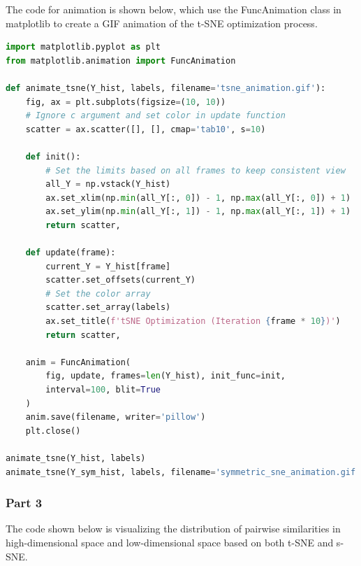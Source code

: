 \documentclass{homework}
\begin{document}
The code for animation is shown below, which use the FuncAnimation class in matplotlib to create a GIF animation of the t-SNE optimization process.

\begin{lstlisting}[language=Python]
import matplotlib.pyplot as plt
from matplotlib.animation import FuncAnimation

def animate_tsne(Y_hist, labels, filename='tsne_animation.gif'):
    fig, ax = plt.subplots(figsize=(10, 10))
    # Ignore c argument and set color in update function
    scatter = ax.scatter([], [], cmap='tab10', s=10)

    def init():
        # Set the limits based on all frames to keep consistent view
        all_Y = np.vstack(Y_hist)
        ax.set_xlim(np.min(all_Y[:, 0]) - 1, np.max(all_Y[:, 0]) + 1)
        ax.set_ylim(np.min(all_Y[:, 1]) - 1, np.max(all_Y[:, 1]) + 1)
        return scatter,

    def update(frame):
        current_Y = Y_hist[frame]
        scatter.set_offsets(current_Y)
        # Set the color array
        scatter.set_array(labels)
        ax.set_title(f'tSNE Optimization (Iteration {frame * 10})')
        return scatter,

    anim = FuncAnimation(
        fig, update, frames=len(Y_hist), init_func=init,
        interval=100, blit=True
    )
    anim.save(filename, writer='pillow')
    plt.close()

animate_tsne(Y_hist, labels)
animate_tsne(Y_sym_hist, labels, filename='symmetric_sne_animation.gif')
\end{lstlisting}

\subsubsection{Part 3}

The code shown below is visualizing the distribution of pairwise similarities in high-dimensional space and low-dimensional space based on both t-SNE and s-SNE.
\end{document}
